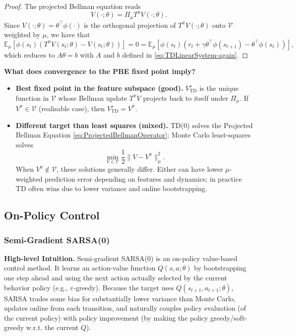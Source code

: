 \documentclass[
]{book}
\theoremstyle{definition}
\theoremstyle{definition}
\theoremstyle{definition}
\theoremstyle{definition}
\theoremstyle{remark}
\begin{document}
\begin{proof}
The projected Bellman equation reads
\[
V(\cdot;\theta) = \Pi_\mu T^\pi V(\cdot; \theta).
\]
Since \(V(\cdot; \theta) = \theta^\top \phi(\cdot)\) is the orthogonal projection of \(T^\pi V(\cdot; \theta)\) onto \(\mathcal V\) weighted by \(\mu\), we have that
\[
\mathbb{E}_\mu \left[ \phi(s_t) (T^\pi V(s_t;\theta) - V(s_t;\theta)) \right] = 0 = \mathbb{E}_\mu \left[ \phi(s_t) (r_t + \gamma \theta^\top \phi(s_{t+1}) - \theta^\top \phi(s_t) )\right],
\]
which reduces to \(A \theta = b\) with \(A\) and \(b\) defined in \eqref{eq:TDLinearSystem-again}.
\end{proof}

\textbf{What does convergence to the PBE fixed point imply?}

\begin{itemize}
\item
  \textbf{Best fixed point in the feature subspace (good).} \(V_{\text{TD}}^\star\) is the unique function in \(\mathcal V\) whose Bellman update \(T^\pi V\) projects back to itself under \(\Pi_\mu\). If \(V^\pi\in\mathcal V\) (realisable case), then \(V_{\text{TD}}^\star=V^\pi\).
\item
  \textbf{Different target than least squares (mixed).} TD(0) solves the Projected Bellman Equation \eqref{eq:ProjectedBellmanOperator}; Monte Carlo least-squares solves
  \[
  \min_{V\in\mathcal V} \frac{1}{2} \|V - V^\pi\|_\mu^2.
  \]
  When \(V^\pi\notin\mathcal V\), these solutions generally differ. Either can have lower \(\mu\)-weighted prediction error depending on features and dynamics; in practice TD often wins due to lower variance and online bootstrapping.
\end{itemize}

\subsection{On-Policy Control}\label{on-policy-control-1}

\subsubsection{Semi-Gradient SARSA(0)}\label{semi-gradient-sarsa0}

\textbf{High-level Intuition.} Semi-gradient SARSA(0) is an on-policy value-based control method. It learns an action-value function \(Q(s,a;\theta)\) by bootstrapping one step ahead and using the next action actually selected by the current behavior policy (e.g., \(\varepsilon\)-greedy). Because the target uses \(Q(s_{t+1},a_{t+1};\theta)\), SARSA trades some bias for substantially lower variance than Monte Carlo, updates online from each transition, and naturally couples policy evaluation (of the current policy) with policy improvement (by making the policy greedy/soft-greedy w.r.t. the current \(Q\)).
\end{document}
